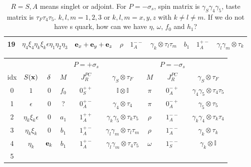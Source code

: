 \begin{table}
\begin{center}
\begin{tabular}{c|c|c|ccc|ccc}
19 & $\eta_4\xi_4\eta_k\xi_k\epsilon\eta _1\eta _2\eta _3$ & ${\bf e}_x+{\bf e}_y+{\bf e}_z$ & $\rho$ & $1^{--}_A$ & $\gamma_k\otimes\tau_l\tau_m$        & $b_1$    & $1^{+-}_A$ & $\gamma _l\gamma _m\otimes \tau _k$ \\
\hline
\end{tabular}
\end{center}
\caption{\label{tab:staggeredMeson}$R=S,A$ means singlet or adjoint. For $P=-\sigma _s$, spin matrix is $\gamma _S\gamma _4\gamma _5$, taste matrix is $\tau _F\tau _4\tau _5$. $k,l,m=1,2,3$ or $k,l,m=x,y,z$ with $k\neq l\neq m$. \textcolor[rgb]{1,0,0}{If we do not have s quark, how can we have $\eta$, $\omega$, $f_0$ and $h_1$?}}
\end{table}

\begin{table}
\begin{center}
\begin{tabular}{c|c|c|ccc|ccc}
\hline
 & & & & $P=+\sigma _s$ & & & $P=-\sigma _s$ & \\
idx & $S({\bf x})$ & ${\bf \delta}$ & $M$ & $J^{PC}_R$ & $\gamma _S\otimes \tau _F$ & $M$ & $J^{PC}_R$ & $\gamma _S\otimes \tau _F$\\
\hline
0  & $1$                                         & $0$                             & $f_0$    & $0^{++}_S$ & $\mathbb{I}\otimes \mathbb{I}$               & $\pi$    & $0^{-+}_A$ & $\gamma_4\gamma _5\otimes \tau _4\tau _5$ \\
1  & $\epsilon$                                  & $0$                             & ?        & $0^{+-}_A$ & $\gamma _4 \otimes \tau _4$                  & $\pi$    & $0^{-+}_A$ & $\gamma _5 \otimes \tau _5$ \\
2  & $\eta _k \xi _k \epsilon$                   & $0$                             & $a_1$    & $1^{++}_A$ & $\gamma _k\gamma _5 \otimes \tau _k\tau _5$  & $\rho$   & $1^{--}_A$ & $\gamma _k\gamma _4 \otimes \tau _k\tau _4$ \\
3  & $\eta _k \xi _k$                            & $0$                             & $b_1$    & $1^{+-}_A$ & $\gamma _l\gamma _m \otimes \tau _l\tau _m$  & $\rho$   & $1^{--}_A$ & $\gamma _k \otimes \tau _k$ \\
\textcolor[rgb]{1,0,0}{4}
   & $\eta _k$                                   & ${\bf e}_k$                     & $b_1$    & $1^{+-}_A$ & $\gamma _l\gamma _m\otimes \tau _4\tau _5$   & $\omega$ & $1^{--}_S$ & $\gamma _k\otimes \mathbb{I}$                \\
\textcolor[rgb]{1,0,0}{5}

\end{tabular}
\end{center}
\end{table}
